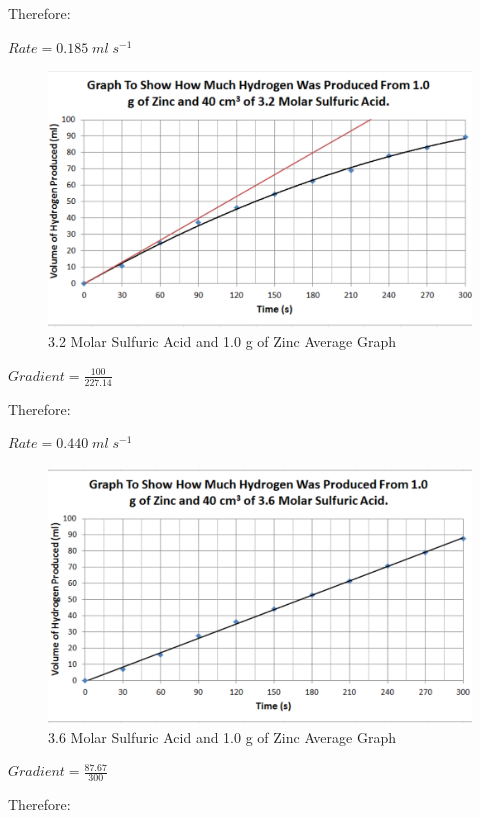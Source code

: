 Therefore:

$Rate = 0.185 \; ml \; s^{-1}$

\begin{figure}[H]
    \includegraphics[width=\textwidth]{./Analysis/Images/1NonCatalyst/32Molar.pdf}
    \caption{3.2 Molar Sulfuric Acid and 1.0 g of Zinc Average Graph} \label{fig:32MolarSAGradient}
\end{figure}

$Gradient = \frac{100}{227.14}$

Therefore:

$Rate = 0.440 \; ml \; s^{-1}$

\begin{figure}[H]
    \includegraphics[width=\textwidth]{./Analysis/Images/1NonCatalyst/36Molar.pdf}
    \caption{3.6 Molar Sulfuric Acid and 1.0 g of Zinc Average Graph} \label{fig:36MolarSAGradient}
\end{figure}

$Gradient = \frac{87.67}{300}$

Therefore:


